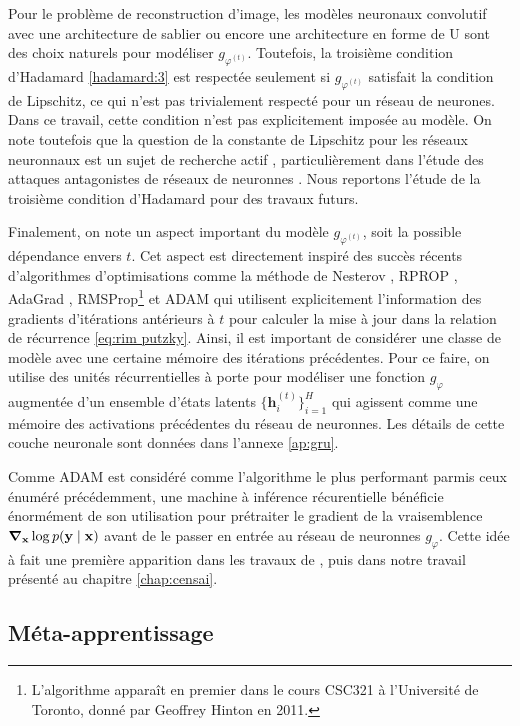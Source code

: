 Pour le problème de reconstruction d'image, les modèles neuronaux convolutif avec une architecture de sablier ou 
encore une architecture en forme de U \citep{Ronneberger2015} sont des choix naturels pour modéliser $g_{\varphi^{(t)}}$. 
Toutefois, la troisième condition d'Hadamard \ref{hadamard:3} est respectée seulement si $g_{\varphi^{(t)}}$ 
satisfait la condition de Lipschitz, ce qui n'est pas trivialement respecté pour un réseau de neurones.
Dans ce travail, cette condition n'est pas explicitement imposée au modèle. 
On note toutefois que la question de la constante de Lipschitz pour les réseaux neuronnaux est un 
sujet de recherche actif \citep[e.g.][]{}, particulièrement dans l'étude des attaques antagonistes de réseaux de neuronnes \citep[e.g.][]{}. 
Nous reportons l'étude de la troisième condition d'Hadamard pour des travaux futurs.

Finalement, on note un aspect important du modèle $g_{\varphi^{(t)}}$, soit la possible dépendance envers $t$. Cet aspect 
est directement inspiré des succès récents d'algorithmes d'optimisations comme la méthode de Nesterov \citep{Nesterov1983}, 
RPROP \citep{Riedmiller1993},
AdaGrad \citep{Duchi2011}, RMSProp\footnote{L'algorithme apparaît en premier dans le cours CSC321 à l'Université de Toronto, donné par Geoffrey Hinton en 2011.} \citep{Hinton2012} 
et ADAM \citep{Kingma2014}
qui utilisent explicitement l'information 
des gradients d'itérations antérieurs à $t$ pour calculer la mise à jour dans la relation de récurrence \eqref{eq:rim putzky}.
Ainsi, il est important de considérer une classe de modèle avec une certaine mémoire des itérations précédentes. Pour ce 
faire, on utilise des unités récurrentielles à porte \citep[de l'anglais \textit{gated recurrent units}:][]{Cho2014} 
pour modéliser une fonction $g_{\varphi}$ augmentée d'un ensemble d'états latents $\{\mathbf{h}^{(t)}_i\}_{i=1}^{H}$ 
qui agissent comme une mémoire des activations précédentes du réseau de neuronnes. Les détails 
de cette couche neuronale sont données dans l'annexe \ref{ap:gru}.

Comme ADAM est considéré comme l'algorithme le plus performant parmis ceux énuméré précédemment, 
une machine à inférence récurentielle bénéficie énormément de son utilisation pour 
prétraiter le gradient de la vraisemblence $\grad_{\mathbf{x}}\log p(\mathbf{y} \mid \mathbf{x})$ 
avant de le passer en entrée au réseau de neuronnes $g_{\varphi}$. 
Cette idée à fait une première apparition dans les travaux de 
\citet{Modi2021}, puis dans notre travail présenté au chapitre \ref{chap:censai}. 


\subsection{Méta-apprentissage}



